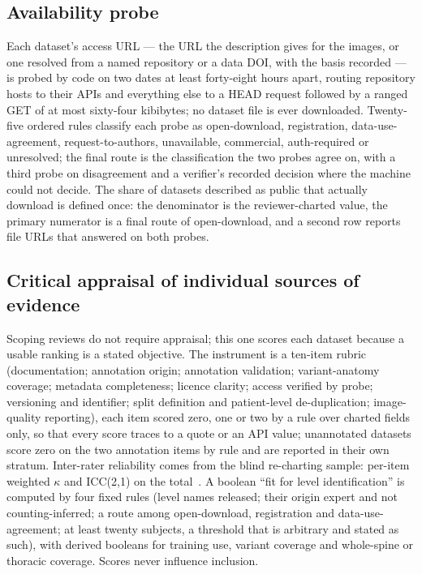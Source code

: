 \documentclass[11pt,a4paper]{article}
\begin{document}
\subsection{Availability probe}\label{sec:probe}
Each dataset's access URL --- the URL the description gives for the images, or one resolved from a named repository or a data DOI, with the basis recorded --- is probed by code on two dates at least forty-eight hours apart, routing repository hosts to their APIs and everything else to a HEAD request followed by a ranged GET of at most sixty-four kibibytes; no dataset file is ever downloaded. Twenty-five ordered rules classify each probe as open-download, registration, data-use-agreement, request-to-authors, unavailable, commercial, auth-required or unresolved; the final route is the classification the two probes agree on, with a third probe on disagreement and a verifier's recorded decision where the machine could not decide. The share of datasets described as public that actually download is defined once: the denominator is the reviewer-charted value, the primary numerator is a final route of open-download, and a second row reports file URLs that answered on both probes.

\subsection{Critical appraisal of individual sources of evidence}\label{sec:appraisal}
Scoping reviews do not require appraisal; this one scores each dataset because a usable ranking is a stated objective. The instrument is a ten-item rubric (documentation; annotation origin; annotation validation; variant-anatomy coverage; metadata completeness; licence clarity; access verified by probe; versioning and identifier; split definition and patient-level de-duplication; image-quality reporting), each item scored zero, one or two by a rule over charted fields only, so that every score traces to a quote or an API value; unannotated datasets score zero on the two annotation items by rule and are reported in their own stratum. Inter-rater reliability comes from the blind re-charting sample: per-item weighted $\kappa$ and ICC(2,1) on the total~\citep{shrout1979icc}. A boolean ``fit for level identification'' is computed by four fixed rules (level names released; their origin expert and not counting-inferred; a route among open-download, registration and data-use-agreement; at least twenty subjects, a threshold that is arbitrary and stated as such), with derived booleans for training use, variant coverage and whole-spine or thoracic coverage. Scores never influence inclusion.
\end{document}
